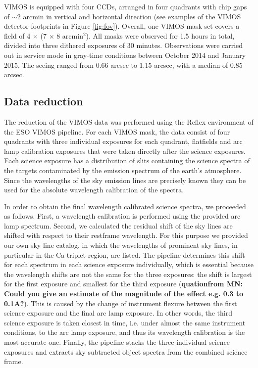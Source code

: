 \documentclass[useAMS,usenatbib]{mn2e}
\begin{document}
VIMOS is equipped with four CCDs, arranged in four quadrants with chip gaps of $\sim$2 arcmin in vertical and horizontal direction (see examples of the VIMOS detector footprints in Figure \ref{fig:fov}). Overall, one VIMOS mask set covers a field of 4 $\times$ (7 $\times$ 8 arcmin$^2$). All masks were observed for 1.5 hours in total, divided into three dithered exposures of 30 minutes. Observations were carried out in service mode in gray-time conditions between October 2014 and January 2015. The seeing ranged from 0.66 arcsec to 1.15 arcsec, with a median of 0.85 arcsec. 

\subsection{Data reduction}

The reduction of the VIMOS data was performed using the Reflex 
environment \citep{Freudling13} of the ESO VIMOS pipeline. 
For each VIMOS mask, the data consist of four 
quadrants with three individual exposures for each quadrant, flatfields and
arc lamp calibration exposures that were taken directly after the science 
exposures. Each science exposure has a distribution of slits containing the 
science spectra of the targets contaminated by the emission spectrum of the 
earth's atmosphere. Since the wavelengths of the sky emission lines are 
precisely known they can be used for the absolute wavelength calibration of 
the spectra.

In order to obtain the final wavelength calibrated science spectra, we 
proceeded as follows. First, a wavelength calibration 
is performed using the provided arc lamp spectrum. Second, we calculated
the residual shift of the sky lines are shifted with respect to their restframe 
wavelength. For this purpose we provided our own sky line catalog, in which 
the wavelengths of prominent sky lines, in particular in the Ca triplet 
region, are listed. The pipeline determines this shift for each spectrum in 
each science exposure individually, which is essential because the wavelength 
shifts are not the same for the three exposures: the shift is largest for the 
first exposure and smallest for the third exposure ({\bf quationfrom MN: Could you give an estimate of the magnitude of the effect e.g. 0.3 to 0.1A?}). This is caused by the 
change of instrument flexure between the first science exposure and the final 
arc lamp exposure. In other words, the third science exposure is taken 
closest in time, i.e. under almost the same instrument conditions, to the arc 
lamp exposure, and thus its wavelength calibration is the most accurate one. 
Finally, the pipeline stacks the three individual science exposures and 
extracts sky subtracted object spectra from the combined science frame.
\end{document}
